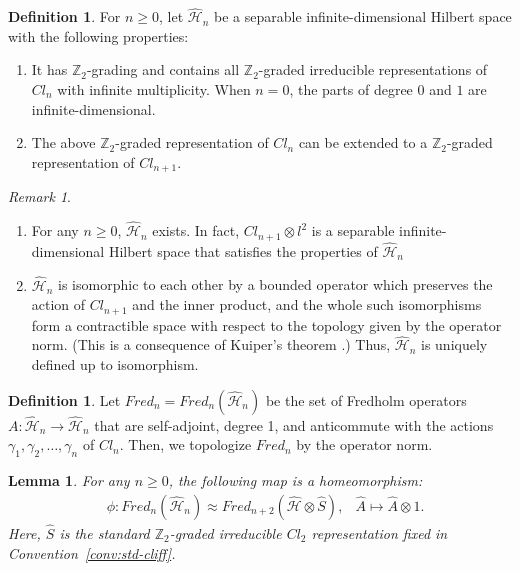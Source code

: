 \documentclass{amsart}
\newtheorem{lem}[thm]{Lemma}
\theoremstyle{definition}
\newtheorem{dfn}[thm]{Definition}
\theoremstyle{remark}
\newtheorem{rem}[thm]{Remark}
\begin{document}
\begin{dfn}
For $n \geq 0$, let $\hat{\mathcal{H}}_n$ be a separable infinite-dimensional Hilbert space with the following properties:
\begin{enumerate}
\item It has $\mathbb{Z}_{2}$-grading and contains all $\mathbb{Z}_{2}$-graded irreducible representations of $Cl_n$ with infinite multiplicity. When $n = 0$, the parts of degree $0$ and $1$ are infinite-dimensional.
\item The above $\mathbb{Z}_{2}$-graded representation of $Cl_n$ can be extended to a $\mathbb{Z}_{2}$-graded representation of $Cl_{n+1}$.
\end{enumerate}
\end{dfn}



\begin{rem}
\begin{enumerate}
\item For any $n \geq 0$, $\hat{\mathcal{H}}_n$ exists. In fact, $Cl_{n+1}\otimes l^2$ is a separable infinite-dimensional Hilbert space that satisfies the properties of 
$\hat{\mathcal{H}}_n$
\item  $\hat{\mathcal{H}}_n$ is isomorphic to each other by a bounded operator which preserves the action of $Cl_{n+1}$ and the inner product, and the whole such isomorphisms form a contractible space with respect to the topology given by the operator norm. (This  is a consequence of Kuiper's theorem \cite{Kuiper}.)
Thus, $\hat{\mathcal{H}}_n$ is uniquely defined  up to isomorphism.
\end{enumerate}
\end{rem}



\begin{dfn}
Let $Fred_n=Fred_n(\hat{\mathcal{H}}_n)$ be the set of Fredholm operators $A \colon \hat{\mathcal{H}}_n \to \hat{\mathcal{H}}_n$ that are self-adjoint, degree 1, and anticommute with the actions $\gamma_1, \gamma_2, \ldots, \gamma_n$ of $Cl_n$. Then, we topologize $Fred_n$ by the operator norm.
\end{dfn}


\begin{lem}\label{lem:3.3}
For any $n \geq 0$, the following map is a homeomorphism:
\begin{align*}
&\phi \colon Fred_n(\hat{\mathcal{H}}_n)\approx Fred_{n+2}(\hat{\mathcal{H}}\otimes \hat{S}), &\hat{A} \mapsto \hat{A}\otimes 1.
\end{align*}
Here, $\hat{S}$ is the standard $\mathbb{Z}_2$-graded irreducible $Cl_2$ representation fixed in Convention~\ref{conv:std-cliff}.
\end{lem}
\end{document}
